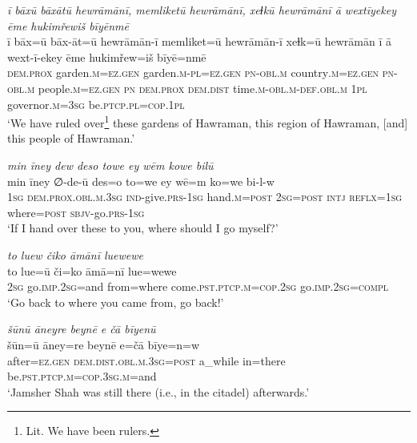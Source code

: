 \ea \label{DP.21}
\textit{ī bāxū bāxātū hewrāmānī, memliketū hewrāmānī, xeɫkū hewrāmānī ā wextīyekey ēme hukimřewiš bīyēnmē} \\ 
\gll ī bāx=ū bāx-āt=ū hewrāmān-ī memliket=ū hewrāmān-ī xeɫk=ū hewrāmān ī ā wext-ī-ekey ēme hukimřew=iš bīyē=nmē \\ 
 \textsc{dem.prox} garden\textsc{.m}\textsc{=ez}\textsc{.gen} garden\textsc{.m}\textsc{-pl}\textsc{=ez}\textsc{.gen} \textsc{pn}\textsc{-obl}\textsc{.m} country\textsc{.m}\textsc{=ez}\textsc{.gen} \textsc{pn}\textsc{-obl}\textsc{.m} people\textsc{.m}\textsc{=ez}\textsc{.gen} \textsc{pn} \textsc{dem.prox} \textsc{dem.dist} time\textsc{.m}\textsc{-obl}\textsc{.m}\textsc{-def}\textsc{.obl}\textsc{.m} \textsc{1pl} governor\textsc{.m}\textsc{=3sg} be\textsc{.ptcp}\textsc{.pl}\textsc{=cop}\textsc{.1pl} \\ 
\glt `We have ruled over\footnote{Lit. We have been rulers.} these gardens of Hawraman, this region of Hawraman, [and] this people of Hawraman.'
\z 
 
\ea \label{DP.23}
\textit{min īney dew deso towe ey wēm kowe bilū} \\ 
\gll min īney ∅-de-ū des=o to=we ey wē=m ko=we bi-l-w \\ 
 \textsc{1sg} \textsc{dem.prox}\textsc{.obl}\textsc{.m}\textsc{.3sg} \textsc{ind-}give\textsc{.prs}\textsc{-1sg} hand\textsc{.m}\textsc{=\textsc{post}} \textsc{2sg}\textsc{=\textsc{post}} \textsc{intj} \textsc{reflx}\textsc{=1sg} where\textsc{=\textsc{post}} \textsc{sbjv-}go\textsc{.prs}\textsc{-1sg} \\ 
\glt `If I hand over these to you, where should I go myself?'
\z 
 
\ea \label{DP.24}
\textit{to luew čiko āmānī luewewe} \\ 
\gll to lue=ū či=ko āmā=nī lue=wewe \\ 
 \textsc{2sg} go\textsc{.imp}\textsc{.\textsc{2sg}}=and from=where come\textsc{.pst}\textsc{.ptcp}\textsc{.m}\textsc{=cop}\textsc{.\textsc{2sg}} go\textsc{.imp}\textsc{.\textsc{2sg}}\textsc{=compl} \\ 
\glt `Go back to where you came from, go back!'
\z 
 
\ea \label{DP.25}
\textit{šūnū āneyre beynē e čā bīyenū} \\ 
\gll šūn=ū āney=re beynē e=čā bīye=n=w \\ 
 after\textsc{=ez}\textsc{.gen} \textsc{dem.dist}\textsc{.obl}\textsc{.m}\textsc{.3sg}\textsc{=\textsc{post}} a\_while in=there be\textsc{.pst}\textsc{.ptcp}\textsc{.m}\textsc{=cop}\textsc{.3sg}\textsc{.m}=and \\ 
\glt `Jamsher Shah was still there (i.e., in the citadel) afterwards.'
\z 
 
